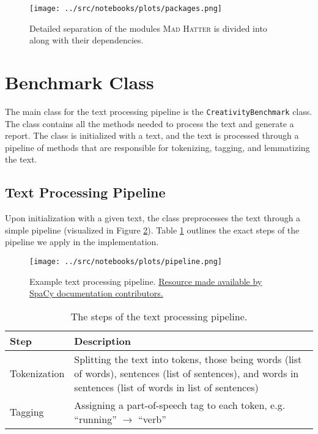 \begin{figure}[htbp]
    \centering
    \texttt{[image: ../src/notebooks/plots/packages.png]}
    \caption{Detailed separation of the modules \textsc{Mad Hatter} is divided into along with their dependencies.}
    \label{fig:package_structure}
\end{figure}

\section{Benchmark Class}
The main class for the text processing pipeline is the \texttt{CreativityBenchmark} class. The class contains all the methods needed to process the text and generate a report. The class is initialized with a text, and the text is processed through a pipeline of methods that are responsible for tokenizing, tagging, and lemmatizing the text. 

\subsection{Text Processing Pipeline}
Upon initialization with a given text, the class preprocesses the text through a simple pipeline (visualized in Figure \ref{fig:processing_pipeline}).  Table \ref{tab:pipeline} outlines the exact steps of the pipeline we apply in the implementation.

\begin{figure}[htbp]
    \centering
    \texttt{[image: ../src/notebooks/plots/pipeline.png]}
    \caption{Example text processing pipeline. \href{https://spacy.io/usage/processing-pipelines}{Resource made available by SpaCy documentation contributors.}}\label{fig:processing_pipeline}
\end{figure}

\begin{table}[htbp]
    \begin{tabular}{p{}p{}}
        \toprule
        \textbf{Step} & \textbf{Description} \\
        \midrule
        Tokenization & Splitting the text into tokens, those being words (list of words), sentences (list of sentences), and words in sentences (list of words in list of sentences) \\
        Tagging & Assigning a part-of-speech tag to each token, e.g. ``running'' $\to$ ``verb'' \\
        \bottomrule
        
    \end{tabular}
    \caption{The steps of the text processing pipeline.}\label{tab:pipeline}
\end{table}

